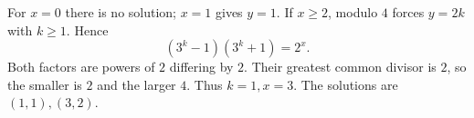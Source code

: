 For $x=0$ there is no solution; $x=1$ gives $y=1$. If $x\ge2$, modulo $4$ forces $y=2k$ with $k\ge1$. Hence
\[
(3^k-1)(3^k+1)=2^x.
\]
Both factors are powers of $2$ differing by $2$. Their greatest common divisor is $2$, so the smaller is $2$ and the larger $4$. Thus $k=1,x=3$. The solutions are $\boxed{(1,1),(3,2)}$.
